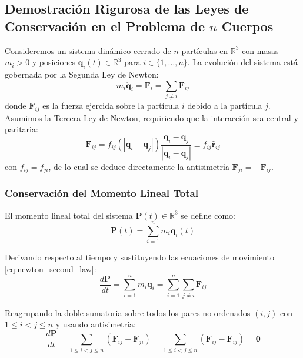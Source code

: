 \documentclass[11pt, a4paper]{article}
\begin{document}
	\subsection{Demostración Rigurosa de las Leyes de Conservación en el Problema de $n$ Cuerpos}
	
	Consideremos un sistema dinámico cerrado de $n$ partículas en $\mathbb{R}^3$ con masas $m_i > 0$ y posiciones $\mathbf{q}_i(t) \in \mathbb{R}^3$ para $i \in \{1, \dots, n\}$. La evolución del sistema está gobernada por la Segunda Ley de Newton:
	\begin{equation}
		m_i \ddot{\mathbf{q}}_i = \mathbf{F}_i = \sum_{j \neq i} \mathbf{F}_{ij}
		\label{eq:newton_second_law}
	\end{equation}
	donde $\mathbf{F}_{ij}$ es la fuerza ejercida sobre la partícula $i$ debido a la partícula $j$. Asumimos la Tercera Ley de Newton, requiriendo que la interacción sea central y paritaria:
	\begin{equation}
		\mathbf{F}_{ij} = f_{ij}(|\mathbf{q}_i - \mathbf{q}_j|) \frac{\mathbf{q}_i - \mathbf{q}_j}{|\mathbf{q}_i - \mathbf{q}_j|} \equiv f_{ij} \hat{\mathbf{r}}_{ij}
		\label{eq:pairwise_central_force}
	\end{equation}
	con $f_{ij} = f_{ji}$, de lo cual se deduce directamente la antisimetría $\mathbf{F}_{ji} = -\mathbf{F}_{ij}$.
	
	\subsubsection{Conservación del Momento Lineal Total}
	
	El momento lineal total del sistema $\mathbf{P}(t) \in \mathbb{R}^3$ se define como:
	\begin{equation}
		\mathbf{P}(t) = \sum_{i=1}^n m_i \dot{\mathbf{q}}_i(t)
	\end{equation}
	
	Derivando respecto al tiempo y sustituyendo las ecuaciones de movimiento \eqref{eq:newton_second_law}:
	\begin{equation}
		\frac{d\mathbf{P}}{dt} = \sum_{i=1}^n m_i \ddot{\mathbf{q}}_i = \sum_{i=1}^n \sum_{j \neq i} \mathbf{F}_{ij}
	\end{equation}
	
	Reagrupando la doble sumatoria sobre todos los pares no ordenados $(i, j)$ con $1 \le i < j \le n$ y usando antisimetría:
	\begin{equation}
		\frac{d\mathbf{P}}{dt} = \sum_{1 \le i < j \le n} (\mathbf{F}_{ij} + \mathbf{F}_{ji}) = \sum_{1 \le i < j \le n} (\mathbf{F}_{ij} - \mathbf{F}_{ij}) = \mathbf{0}
	\end{equation}
	
\end{document}

